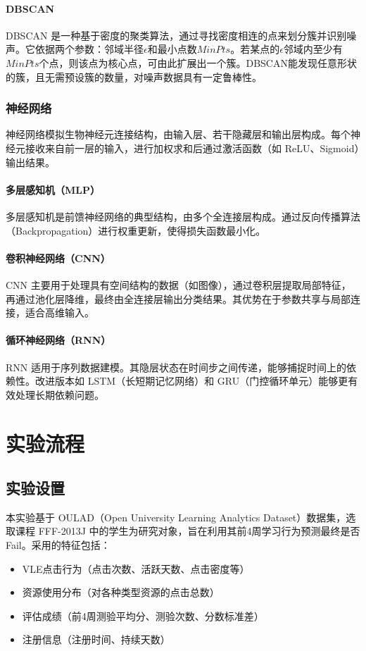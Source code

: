 \documentclass{SYSUReport}
\begin{document}
\paragraph{DBSCAN}
DBSCAN 是一种基于密度的聚类算法，通过寻找密度相连的点来划分簇并识别噪声。它依据两个参数：邻域半径$\epsilon$和最小点数$MinPts$。若某点的$\epsilon$邻域内至少有$MinPts$个点，则该点为核心点，可由此扩展出一个簇。DBSCAN能发现任意形状的簇，且无需预设簇的数量，对噪声数据具有一定鲁棒性。

\subsubsection{神经网络}
神经网络模拟生物神经元连接结构，由输入层、若干隐藏层和输出层构成。每个神经元接收来自前一层的输入，进行加权求和后通过激活函数（如 ReLU、Sigmoid）输出结果。

\paragraph{多层感知机（MLP）}
多层感知机是前馈神经网络的典型结构，由多个全连接层构成。通过反向传播算法（Backpropagation）进行权重更新，使得损失函数最小化。

\paragraph{卷积神经网络（CNN）}
CNN 主要用于处理具有空间结构的数据（如图像），通过卷积层提取局部特征，再通过池化层降维，最终由全连接层输出分类结果。其优势在于参数共享与局部连接，适合高维输入。

\paragraph{循环神经网络（RNN）}
RNN 适用于序列数据建模。其隐层状态在时间步之间传递，能够捕捉时间上的依赖性。改进版本如 LSTM（长短期记忆网络）和 GRU（门控循环单元）能够更有效处理长期依赖问题。


\section{实验流程}


\subsection{实验设置}
本实验基于 OULAD（Open University Learning Analytics Dataset）数据集，选取课程 FFF-2013J 中的学生为研究对象，旨在利用其前4周学习行为预测最终是否Fail。采用的特征包括：
\begin{itemize}
    \item VLE点击行为（点击次数、活跃天数、点击密度等）
    \item 资源使用分布（对各种类型资源的点击总数）
    \item 评估成绩（前4周测验平均分、测验次数、分数标准差）
    \item 注册信息（注册时间、持续天数）
\end{itemize}
\end{document}
